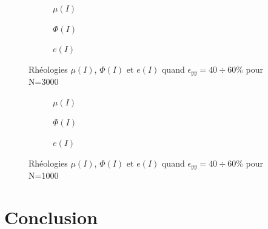 \documentclass[5p,authoryear,square]{elsarticle}
\begin{document}
\begin{figure}[htbp]
    \centering
    \begin{subfigure}[b]{0.3\textwidth}
        \centering
        \scalebox{0.5}{}
        \caption{$\mu(I)$}
        \label{3000_mu_I_fit}
    \end{subfigure}
    \hfill
    \begin{subfigure}[b]{0.3\textwidth}
        \centering
        \scalebox{0.5}{}
        \caption{$\Phi(I)$}
        \label{3000_phi_I_fit}
    \end{subfigure}
    \hfill
    \begin{subfigure}[b]{0.3\textwidth}
        \centering
        \scalebox{0.5}{}
        \caption{$e(I)$}
        \label{3000_e_I_fit}
    \end{subfigure}
    \caption{Rhéologies $\mu(I)$, $\Phi(I)$ et $e(I)$ quand $\epsilon_{yy} = 40 \div 60\%$ pour N=3000}
    \label{rheologies_3000}
\end{figure}

\begin{figure}[htbp]
    \centering
    \begin{subfigure}[b]{0.3\textwidth}
        \centering
        \scalebox{0.5}{}
        \caption{$\mu(I)$}
        \label{1000_mu_I_fit}
    \end{subfigure}
    \hfill
    \begin{subfigure}[b]{0.3\textwidth}
        \centering
        \scalebox{0.5}{}
        \caption{$\Phi(I)$}
        \label{1000_phi_I_fit}
    \end{subfigure}
    \hfill
    \begin{subfigure}[b]{0.3\textwidth}
        \centering
        \scalebox{0.5}{}
        \caption{$e(I)$}
        \label{1000_e_I_fit}
    \end{subfigure}
    \caption{Rhéologies $\mu(I)$, $\Phi(I)$ et $e(I)$ quand $\epsilon_{yy} = 40 \div 60\%$ pour N=1000}
    \label{rheologies_1000}
\end{figure}

\FloatBarrier
\section{Conclusion}\label{discussion}



\end{document}
